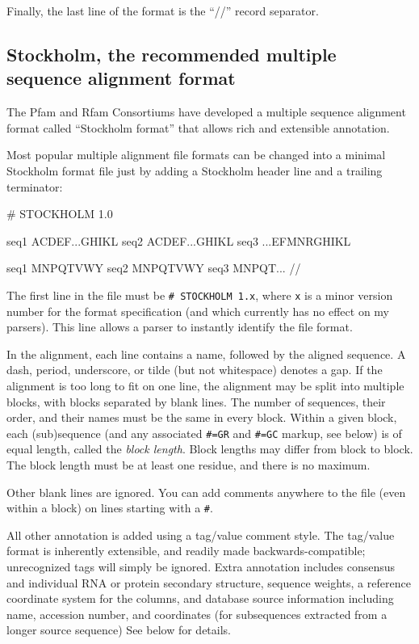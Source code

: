 Finally, the last line of the format is the ``//'' record separator.

\subsection{Stockholm, the recommended multiple sequence alignment format}
\label{section:stockholm}

The Pfam and Rfam Consortiums have developed a multiple sequence
alignment format called ``Stockholm format'' that allows rich and
extensible annotation. 

Most popular multiple alignment file formats can be changed into a
minimal Stockholm format file just by adding a Stockholm header line
and a trailing \prog{//} terminator:

\begin{sreoutput}
# STOCKHOLM 1.0

seq1  ACDEF...GHIKL
seq2  ACDEF...GHIKL
seq3  ...EFMNRGHIKL

seq1  MNPQTVWY
seq2  MNPQTVWY
seq3  MNPQT...
//
\end{sreoutput}

The first line in the file must be \verb+# STOCKHOLM 1.x+, where
\verb+x+ is a minor version number for the format specification
(and which currently has no effect on my parsers). This line allows a
parser to instantly identify the file format.

In the alignment, each line contains a name, followed by the aligned
sequence. A dash, period, underscore, or tilde (but not whitespace)
denotes a gap. If the alignment is too long to fit on one line, the
alignment may be split into multiple blocks, with blocks separated by
blank lines. The number of sequences, their order, and their names
must be the same in every block. Within a given block, each
(sub)sequence (and any associated \verb+#=GR+ and \verb+#=GC+ markup,
see below) is of equal length, called the \textit{block length}. Block
lengths may differ from block to block. The block length must be at
least one residue, and there is no maximum.

Other blank lines are ignored. You can add comments anywhere to the
file (even within a block) on lines starting with a \verb+#+.

All other annotation is added using a tag/value comment style. The
tag/value format is inherently extensible, and readily made
backwards-compatible; unrecognized tags will simply be ignored. Extra
annotation includes consensus and individual RNA or protein secondary
structure, sequence weights, a reference coordinate system for the
columns, and database source information including name, accession
number, and coordinates (for subsequences extracted from a longer
source sequence) See below for details.

